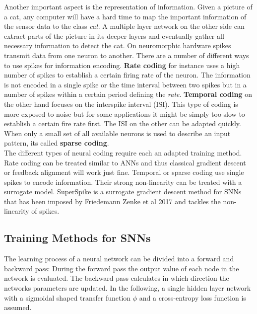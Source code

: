 Another important aspect is the representation of information. Given a picture of a cat, any computer will have a hard time to map the important information of the sensor data to the class \textit{cat}. A multiple layer network on the other side can extract parts of the picture in its deeper layers and eventually gather all necessary information to detect the cat. On neuromorphic hardware spikes transmit data from one neuron to another. There are a number of different ways to use spikes for information encoding. \textbf{Rate coding} for instance uses a high number of spikes to establish a certain firing rate of the neuron. The information is not encoded in a single spike or the time interval between two spikes but in a number of spikes within a certain period defining the \textit{rate}. \textbf{Temporal coding} on the other hand focuses on the interspike interval (ISI). This type of coding is more exposed to noise but for some applications it might be simply too slow to establish a certain fire rate first. The ISI on the other can be adapted quickly. When only a small set of all available neurons is used to describe an input pattern, its called \textbf{sparse coding}.\\

The different types of neural coding require each an adapted training method. Rate coding can be treated similar to ANNs and thus classical gradient descent or feedback alignment will work just fine. Temporal or sparse coding use single spikes to encode information. Their strong non-linearity can be treated with a surrogate model. SuperSpike is a surrogate gradient descent method for SNNs that has been imposed by Friedemann Zenke et al 2017 and tackles the non-linearity of spikes.\\

\subsection{Training Methods for SNNs}

The learning process of a neural network can be divided into a forward and backward pass: During the forward pass the output value of each node in the network is evaluated. The backward pass calculates in which direction the networks parameters are updated. In the following, a single hidden layer network with a sigmoidal shaped transfer function $\phi$ and a cross-entropy loss function is assumed. \\

